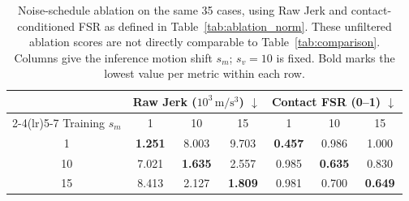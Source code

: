 \begin{table}[!htbp]
\centering
\small
\setlength{\belowcaptionskip}{6pt}
\caption{Noise-schedule ablation on the same 35 cases, using Raw Jerk and contact-conditioned FSR as defined in Table~\ref{tab:ablation_norm}. These unfiltered ablation scores are not directly comparable to Table~\ref{tab:comparison}. Columns give the inference motion shift $s_m$; $s_v=10$ is fixed. Bold marks the lowest value per metric within each row.}
\label{tab:ablation_schedule}
\setlength{\tabcolsep}{7pt}
\begin{tabular}{c c c c c c c}
\toprule
 & \multicolumn{3}{c}{Raw Jerk ($10^3\,\mathrm{m/s^3}$) $\downarrow$} & \multicolumn{3}{c}{Contact FSR (0--1) $\downarrow$}\\
\cmidrule(lr){2-4}\cmidrule(lr){5-7}
Training $s_m$ & 1 & 10 & 15 & 1 & 10 & 15\\
\midrule
1 & \textbf{1.251} & 8.003 & 9.703 & \textbf{0.457} & 0.986 & 1.000\\
10 & 7.021 & \textbf{1.635} & 2.557 & 0.985 & \textbf{0.635} & 0.830\\
15 & 8.413 & 2.127 & \textbf{1.809} & 0.981 & 0.700 & \textbf{0.649}\\
\bottomrule
\end{tabular}
\end{table}
